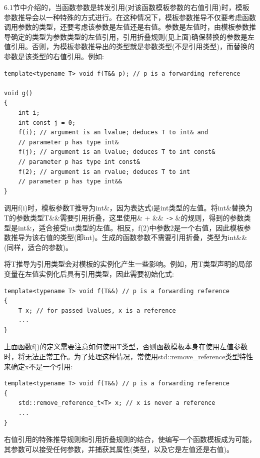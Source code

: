 
6.1节中介绍的，当函数参数是转发引用(对该函数模板参数的右值引用)时，模板参数推导会以一种特殊的方式进行。在这种情况下，模板参数推导不仅要考虑函数调用参数的类型，还要考虑该参数是左值还是右值。参数是左值时，由模板参数推导确定的类型为参数类型的左值引用，引用折叠规则(见上面)确保替换的参数是左值引用。否则，为模板参数推导出的类型就是参数类型(不是引用类型)，而替换的参数是该类型的右值引用。例如:

\begin{lstlisting}[style=styleCXX]
template<typename T> void f(T&& p); // p is a forwarding reference

void g()
{
	int i;
	int const j = 0;
	f(i); // argument is an lvalue; deduces T to int& and
	// parameter p has type int&
	f(j); // argument is an lvalue; deduces T to int const&
	// parameter p has type int const&
	f(2); // argument is an rvalue; deduces T to int
	// parameter p has type int&&
}
\end{lstlisting}

调用f(i)时，模板参数T推导为int\&，因为表达式i是int类型的左值。将int\&替换为T的参数类型T\&\&需要引用折叠，这里使用\& + \&\& \texttt{->} \&的规则，得到的参数类型是int\&，适合接受int类型的左值。相反，f(2)中参数2是一个右值，因此模板参数推导为该右值的类型(即int)。生成的函数参数不需要引用折叠，类型为int\&\&(同样，适合的参数)。

将T推导为引用类型会对模板的实例化产生一些影响。例如，用T类型声明的局部变量在左值实例化后具有引用类型，因此需要初始化式:

\begin{lstlisting}[style=styleCXX]
template<typename T> void f(T&&) // p is a forwarding reference
{
	T x; // for passed lvalues, x is a reference
	...
}
\end{lstlisting}

上面函数f()的定义需要注意如何使用T类型，否则函数模板本身在使用左值参数时，将无法正常工作。为了处理这种情况，常使用std::remove\_reference类型特性来确定x不是一个引用:

\begin{lstlisting}[style=styleCXX]
template<typename T> void f(T&&) // p is a forwarding reference
{
	std::remove_reference_t<T> x; // x is never a reference
	...
}
\end{lstlisting}



右值引用的特殊推导规则和引用折叠规则的结合，使编写一个函数模板成为可能，其参数可以接受任何参数，并捕获其属性(类型，以及它是左值还是右值)。

